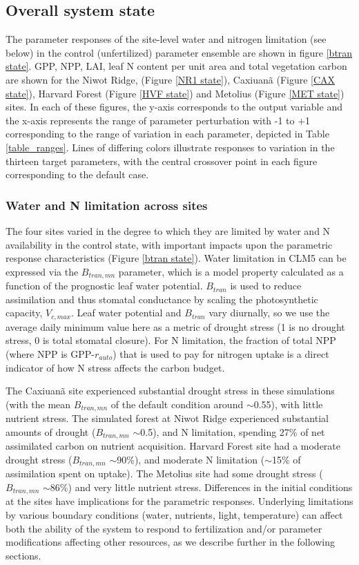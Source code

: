 \documentclass[draft,linenumbers]{agujournal}
\begin{document}
\subsection{Overall system state}
The parameter responses of the site-level water and nitrogen limitation (see below) in the control (unfertilized) parameter ensemble are shown in figure \ref{btran state}. GPP, NPP, LAI, leaf N content per unit area and total vegetation carbon are shown for the Niwot Ridge, (Figure \ref{NR1 state}), Caxiuan\~a (Figure \ref{CAX state}), Harvard Forest (Figure \ref{HVF state}) and Metolius (Figure \ref{MET state}) sites. In each of these figures, the y-axis corresponds to the output variable and the x-axis represents the range of parameter perturbation with -1 to +1 corresponding to the range of variation in each parameter, depicted in Table \ref{table_ranges}. Lines of differing colors illustrate responses to variation in the thirteen target parameters, with the central crossover point in each figure corresponding to the default case.

\subsubsection{Water and N limitation across sites}
The four sites varied in the degree to which they are limited by water and N availability in the control state, with important impacts upon the parametric response characteristics (Figure \ref{btran state}). Water limitation in CLM5 can be expressed via the $B_{tran,mn}$ parameter, which is a model property calculated as a function of the prognostic leaf water potential. $B_{tran}$  is used to reduce assimilation and thus stomatal conductance by scaling the photosynthetic capacity, $V_{c,max}$. Leaf water potential and  $B_{tran}$ vary diurnally, so we use the average daily minimum value here as a metric of drought stress (1 is no drought stress, 0 is total stomatal closure). For N limitation, the fraction of total NPP (where NPP is GPP-$r_{auto}$) that is used to pay for nitrogen uptake is a direct indicator of how N stress affects the carbon budget. 

The Caxiuan\~a site experienced substantial drought stress in these simulations (with the mean $B_{tran,mn}$ of the default condition around $\sim$0.55), with little nutrient stress. The simulated forest at Niwot Ridge experienced substantial amounts of drought ($B_{tran,mn}$ $\sim$0.5), and N limitation, spending 27\% of net assimilated carbon on nutrient acquisition. Harvard Forest site had a moderate drought stress ($B_{tran,mn}$ $\sim$90\%), and moderate N limitation ($\sim$15\% of assimilation spent on uptake). The Metolius site had some drought stress ($B_{tran,mn}$ $\sim$86\%) and very little nutrient stress.  Differences in the initial conditions at the sites have implications for the parametric responses. Underlying limitations by various boundary conditions (water, nutrients, light, temperature) can affect both the ability of the system to respond to fertilization and/or parameter modifications affecting other resources, as we describe further in the following sections. 
\end{document}
